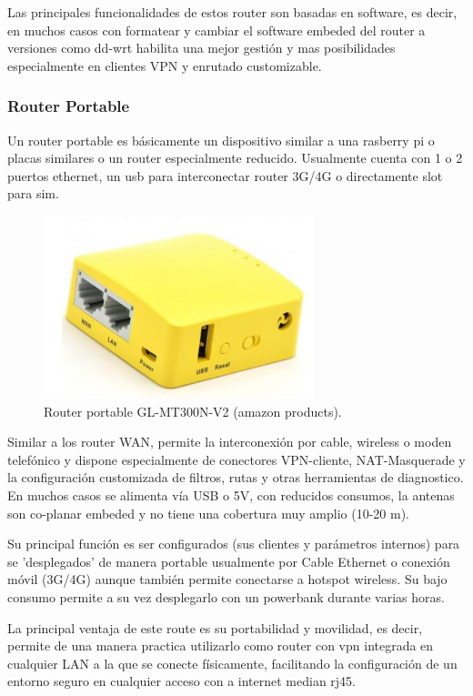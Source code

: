 Las principales funcionalidades de estos router son basadas en software, es decir, en muchos casos con formatear y cambiar el software embeded del router a versiones como dd-wrt\cite{c_dd_wrt} habilita una mejor gestión y mas posibilidades especialmente en clientes VPN y enrutado customizable.

\subsubsection{Router Portable}
Un router portable es básicamente un dispositivo similar a una rasberry pi o placas similares o un router especialmente reducido. Usualmente cuenta con 1 o 2 puertos ethernet, un usb para interconectar router 3G/4G o directamente slot para sim.
\begin{figure}[!htbp]
\begin{center}
\includegraphics[width=0.7\textwidth]{./figuras/router_portable}
\caption{Router portable GL-MT300N-V2 (amazon products).}
\label{F:router_portable}
\end{center}
\end{figure}
Similar a los router WAN, permite la interconexión por cable, wireless o moden telefónico y dispone especialmente de conectores VPN-cliente, NAT-Masquerade y la configuración customizada de filtros, rutas y otras herramientas de diagnostico. En muchos casos se alimenta vía USB o 5V, con reducidos consumos, la antenas son co-planar embeded y no tiene una cobertura muy amplio (10-20 m).

Su principal función es ser configurados (sus clientes y parámetros internos) para se 'desplegados' de manera portable usualmente por Cable Ethernet o conexión móvil (3G/4G) aunque también permite conectarse a hotspot wireless. Su bajo consumo permite a su vez desplegarlo con un powerbank durante varias horas.

La principal ventaja de este route es su portabilidad y movilidad, es decir, permite de una manera practica utilizarlo como router con vpn integrada en cualquier LAN a la que se conecte físicamente, facilitando la configuración de un entorno seguro en cualquier acceso con a internet median rj45.

